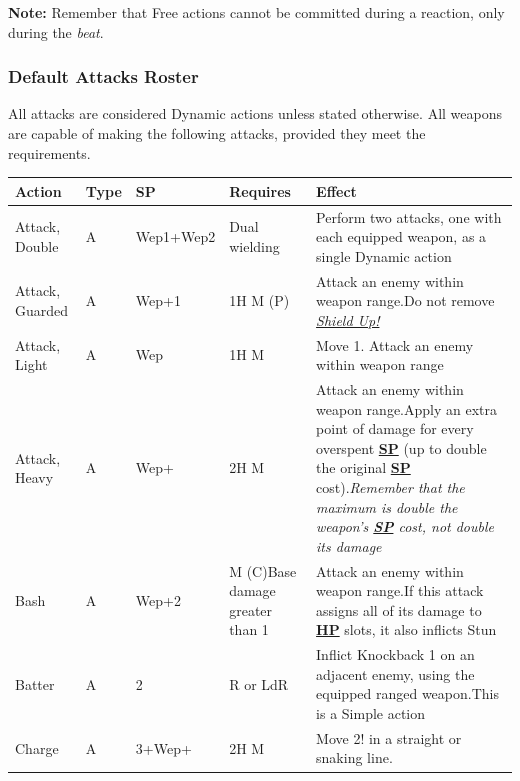 \documentclass[12pt]{article}
\newcommand{\refto}[1]{\hyperlink{#1}{\textbf{#1}}}
\newcommand{\reftoit}[1]{\hyperlink{#1}{\emph{#1}}}
\begin{document}
\begin{tcolorbox}
\textbf{Note:} Remember that Free actions cannot be committed during a reaction, only during the \emph{beat}.
\end{tcolorbox}

\pagebreak

\subsubsection{Default Attacks Roster}
All attacks are considered Dynamic actions unless stated otherwise. All weapons are capable of making the following attacks, provided they meet the requirements.\\
\begin{center}
\begin{tabularx}{\textwidth}{p{}p{}p{}p{}p{}}
\hline
\rowcolor{white} \textbf{Action} & \textbf{Type} & \textbf{SP} & \textbf{Requires} & \textbf{Effect}\setcounter{rownum}{0}\\
\hline
Attack, Double & A & Wep1+Wep2 & Dual wielding & Perform two attacks, one with each equipped weapon, as a single Dynamic action\\
Attack, Guarded & A & Wep+1 & 1H M (P) & Attack an enemy within weapon range.\newline Do not remove \reftoit{Shield Up!}\\
Attack, Light & A & Wep & 1H M & Move 1. Attack an enemy within weapon range\\
Attack, Heavy & A & Wep+ & 2H M & Attack an enemy within weapon range.\newline Apply an extra point of damage for every overspent \refto{SP} (up to double the original \refto{SP} cost).\newline \emph{Remember that the maximum is double the weapon’s \refto{SP} cost, not double its damage}\\
Bash & A & Wep+2 & M (C)\newline Base damage greater than 1 & Attack an enemy within weapon range.\newline If this attack assigns all of its damage to \refto{HP} slots, it also inflicts Stun\\
Batter & A & 2 & R or LdR & Inflict Knockback 1 on an adjacent enemy, using the equipped ranged weapon.\newline This is a Simple action\\
Charge & A & 3+Wep+ & 2H M & Move 2! in a straight or snaking line.\newline

\end{tabularx}
\end{center}
\end{document}
